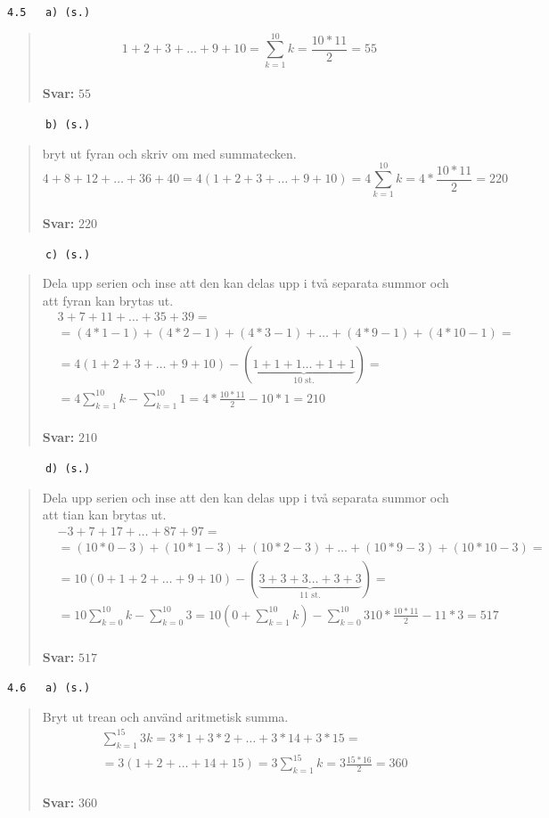 \documentclass[a4paper]{article}
\newcommand{\tskcol}[1]{\textcolor{tskcol}{#1}}
\begin{document}
	\texttt{\tskcol{4.5~~~a) (s.)}}
	\begin{quotation}
		\noindent
		\[1+2+3+\ldots+9+10=\sum_{k=1}^{10}k=\frac{10*11}{2}=55\]
		\\
		\textbf{Svar:} $55$
	\end{quotation}
	
	\pagebreak
	\texttt{\tskcol{~~~~~~b) (s.)}}
	\begin{quotation}
		\noindent
		bryt ut fyran och skriv om med summatecken.
		\[4+8+12+\ldots+36+40=4(1+2+3+\ldots+9+10)=4\sum_{k=1}^{10}k=4*\frac{10*11}{2}=220\]
		\\
		\textbf{Svar:} $220$
	\end{quotation}
	
	\texttt{\tskcol{~~~~~~c) (s.)}}
	\begin{quotation}
		\noindent
		Dela upp serien och inse att den kan delas upp i två separata summor och att fyran kan brytas ut.
		\begin{align*}
		&3+7+11+\ldots+35+39= \\
		&=(4*1-1)+(4*2-1)+(4*3-1)+\ldots+(4*9-1)+(4*10-1)= \\
		&=4(1+2+3+\ldots+9+10)-(\underbrace{1+1+1\ldots+1+1}_\text{10 st.})= \\
		&=4\sum_{k=1}^{10}k-\sum_{k=1}^{10}1=
		4*\frac{10*11}{2}-10*1=
		210
		\end{align*} 
		\\
		\textbf{Svar:} $210$
	\end{quotation}
	
	\texttt{\tskcol{~~~~~~d) (s.)}}
	\begin{quotation}
		\noindent
		Dela upp serien och inse att den kan delas upp i två separata summor och att tian kan brytas ut.
		\begin{align*}
		&-3+7+17+\ldots+87+97= \\
		&=(10*0-3)+(10*1-3)+(10*2-3)+\ldots+(10*9-3)+(10*10-3)= \\
		&=10(0+1+2+\ldots+9+10)-(\underbrace{3+3+3\ldots+3+3}_\text{11 st.})= \\
		&=10\sum_{k=0}^{10}k-\sum_{k=0}^{10}3=
		10(0+\sum_{k=1}^{10}k)-\sum_{k=0}^{10}3
		10*\frac{10*11}{2}-11*3=
		517
		\end{align*} 
		\\
		\textbf{Svar:} $517$
	\end{quotation}
	
	\texttt{\tskcol{4.6~~~a) (s.)}}
	\begin{quotation}
		\noindent
		Bryt ut trean och använd aritmetisk summa.
		\begin{align*}
		&\sum_{k=1}^{15}3k=
		3*1+3*2+\ldots+3*14+3*15= \\
		&=3(1+2+\ldots+14+15)=
		3\sum_{k=1}^{15}k=
		3\frac{15*16}{2}=
		360
		\end{align*}
		\\
		\textbf{Svar:} $360$
	\end{quotation}
	
\end{document}
